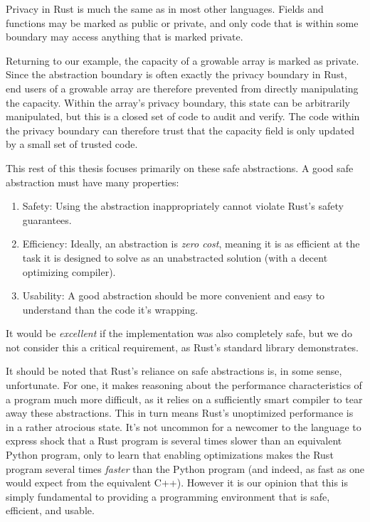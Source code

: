 Privacy in Rust is much the same as in most other languages. Fields and functions may be marked
as public or private, and only code that is within some boundary may access anything that is
marked private.

Returning to our example, the capacity of a growable array is marked as private.
Since the abstraction boundary is often exactly the privacy boundary in Rust,
end users of a growable array are therefore prevented from directly manipulating
the capacity. Within the array's privacy boundary, this state can be arbitrarily
manipulated, but this is a closed set of code to audit and verify. The code within
the privacy boundary can therefore trust that the capacity field is only updated
by a small set of trusted code.

This rest of this thesis focuses primarily on these safe abstractions. A good safe abstraction
must have many properties:

\begin{enumerate}
 \item Safety: Using the abstraction inappropriately cannot violate Rust's safety guarantees.
 \item Efficiency: Ideally, an abstraction is \emph{zero cost}, meaning it is as efficient
  at the task it is designed to solve as an unabstracted solution (with a decent
  optimizing compiler).
 \item Usability: A good abstraction should be more convenient and easy to understand than
  the code it's wrapping.
\end{enumerate}

It would be \emph{excellent} if the implementation was also completely safe, but we
do not consider this a critical requirement, as Rust's standard library demonstrates.

It should be noted that Rust's reliance on safe abstractions is, in some sense,
unfortunate. For one, it makes reasoning about the performance characteristics
of a program much more difficult, as it relies on a sufficiently
smart compiler to tear away these abstractions. This in turn means Rust's unoptimized
performance is in a rather atrocious state. It's not uncommon for a newcomer to
the language to express shock that a Rust program is several times slower than
an equivalent Python program, only to learn that enabling optimizations makes
the Rust program several times \emph{faster} than the Python program (and indeed,
as fast as one would expect from the equivalent C++).
However it is our opinion that this is simply fundamental to providing a
programming environment that is safe, efficient, and usable.


